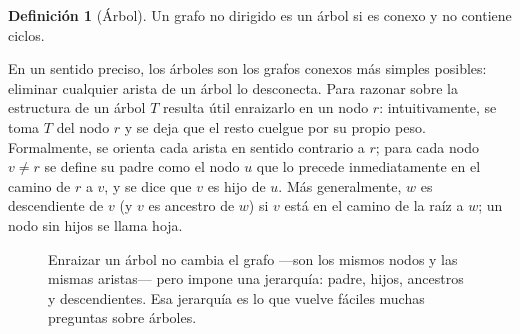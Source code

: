 \documentclass[12pt, spanish, oneside, openany]{book}
\theoremstyle{uprightplain}
\theoremstyle{definition}
\newtheorem{definicion}[teorema]{Definición}
\theoremstyle{remark}
\theoremstyle{definition}
\begin{document}
\begin{definicion}[Árbol]
\label{def:arbol}
Un grafo no dirigido es un árbol si es conexo y no contiene ciclos.
\end{definicion}

En un sentido preciso, los árboles son los grafos conexos más simples posibles: eliminar cualquier arista de un árbol lo desconecta. Para razonar sobre la estructura de un árbol $T$ resulta útil enraizarlo en un nodo $r$: intuitivamente, se toma $T$ del nodo $r$ y se deja que el resto cuelgue por su propio peso. Formalmente, se orienta cada arista en sentido contrario a $r$; para cada nodo $v\neq r$ se define su padre como el nodo $u$ que lo precede inmediatamente en el camino de $r$ a $v$, y se dice que $v$ es hijo de $u$. Más generalmente, $w$ es descendiente de $v$ (y $v$ es ancestro de $w$) si $v$ está en el camino de la raíz a $w$; un nodo sin hijos se llama hoja.

\begin{figure}[H]
\centering
{}
\caption{Enraizar un árbol no cambia el grafo ---son los mismos nodos y las
mismas aristas--- pero impone una jerarquía: padre, hijos, ancestros y
descendientes. Esa jerarquía es lo que vuelve fáciles muchas preguntas sobre
árboles.}
\label{fig:arbol}
\end{figure}
\end{document}
